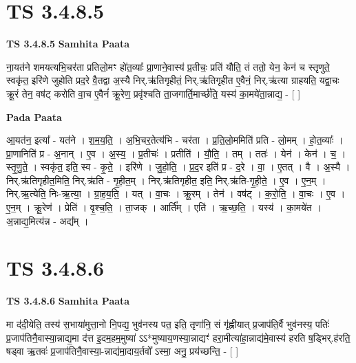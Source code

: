 \documentclass[17pt]{extarticle}
\begin{document}
\section*{ TS 3.4.8.5 }

\textbf{TS 3.4.8.5 } \newline
\textbf{Samhita Paata} \newline

ना॒यत॑ने शमयत्यभि॒चर॑ता प्रतिलो॒मꣳ हो॑त॒व्याः᳚ प्रा॒णाने॒वास्य॑ प्र॒तीचः॒ प्रति॑ यौति॒ तं ततो॒ येन॒ केन॑ च स्तृणुते॒ स्वकृ॑त॒ इरि॑णे जुहोति प्रद॒रे वै॒तद्वा अ॒स्यै निर्.ऋ॑तिगृहीतं॒ निर्.ऋ॑तिगृहीत ए॒वैनं॒ निर्.ऋ॑त्या ग्राहयति॒ यद्वा॒चः क्रू॒रं तेन॒ वष॑ट् करोति वा॒च ए॒वैनं॑ क्रू॒रेण॒ प्रवृ॑श्चति ता॒जगार्ति॒मार्च्छ॑ति॒ यस्य॑ का॒मये॑ता॒न्नाद्य॒ - [  ] \newline

\textbf{Pada Paata} \newline

आ॒यत॑न॒ इत्या᳚ - यत॑ने । श॒म॒य॒ति॒ । अ॒भि॒चर॒तेत्य॑भि - चर॑ता । प्र॒ति॒लो॒ममिति॑ प्रति - लो॒मम् । हो॒त॒व्याः᳚ । प्रा॒णानिति॑ प्र - अ॒नान् । ए॒व । अ॒स्य॒ । प्र॒तीचः॑ । प्रतीति॑ । यौ॒ति॒ । तम् । ततः॑ । येन॑ । केन॑ । च॒ । स्तृ॒णु॒ते॒ । स्वकृ॑त॒ इति॒ स्व - कृ॒ते॒ । इरि॑णे । जु॒हो॒ति॒ । प्र॒द॒र इति॑ प्र - द॒रे । वा॒ । ए॒तत् । वै । अ॒स्यै । निर्.ऋ॑तिगृहीत॒मिति॒ निर्.ऋ॑ति - गृ॒ही॒त॒म् । निर्.ऋ॑तिगृहीत॒ इति॒ निर्.ऋ॑ति-गृ॒ही॒ते॒ । ए॒व । ए॒न॒म् । निर्.ऋ॒त्येति॒ निः-ऋ॒त्या॒ । ग्रा॒ह॒य॒ति॒ । यत् । वा॒चः । क्रू॒रम् । तेन॑ । वष॑ट् । क॒रो॒ति॒ । वा॒चः । ए॒व । ए॒न॒म् । क्रू॒रेण॑ । प्रेति॑ । वृ॒श्च॒ति॒ । ता॒जक् । आर्ति᳚म् । एति॑ । ऋ॒च्छ॒ति॒ । यस्य॑ । का॒मये॑त । अ॒न्नाद्य॒मित्य॑न्न - अद्य᳚म् ।  \newline




\section*{ TS 3.4.8.6 }

\textbf{TS 3.4.8.6 } \newline
\textbf{Samhita Paata} \newline

मा द॑दी॒येति॒ तस्य॑ स॒भाया॑मुत्ता॒नो नि॒पद्य॒ भुव॑नस्य पत॒ इति॒ तृणा॑नि॒ सं गृ॑ह्णीयात् प्र॒जाप॑ति॒र्वै भुव॑नस्य॒ पतिः॑ प्र॒जाप॑तिनै॒वास्या॒न्नाद्य॒मा द॑त्त इ॒दम॒हम॒मुष्या॑ ऽऽ*मुष्याय॒णस्या॒न्नाद्यꣳ॑ हरा॒मीत्या॑हा॒न्नाद्य॑मे॒वास्य॑ हरति ष॒ड्भिर्.ह॑रति॒ षड्वा ऋ॒तवः॑ प्र॒जाप॑तिनै॒वास्या॒-न्नाद्य॑मा॒दाय॒र्तवो᳚ ऽस्मा॒ अनु॒ प्रय॑च्छन्ति॒ - [  ] \newline
\end{document}
